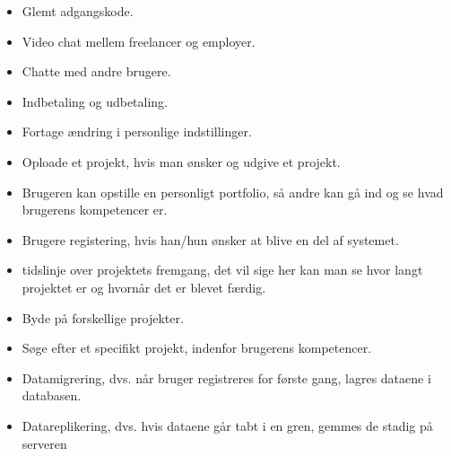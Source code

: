 \begin{itemize}  
    \item Glemt adgangskode.
    \item Video chat mellem freelancer og employer.
    \item Chatte med andre brugere.
    \item Indbetaling og udbetaling.
    \item Fortage ændring i personlige indstillinger. 
    \item Oploade et projekt, hvis man ønsker og udgive et projekt. 
    \item Brugeren kan opstille en personligt portfolio, så andre kan  gå ind og se hvad brugerens kompetencer er.
    \item Brugere registering, hvis han/hun ønsker at blive en del af systemet.
    \item tidslinje over projektets fremgang, det vil sige her kan man se hvor langt projektet er og hvornår det er blevet færdig.
    \item Byde på forskellige projekter. 
    \item Søge efter et specifikt projekt, indenfor brugerens kompetencer.  
    \item Datamigrering, dvs. når bruger registreres for første gang, lagres dataene i databasen.
    \item Datareplikering, dvs. hvis dataene går tabt i en gren, gemmes de stadig på serveren
\end{itemize}



